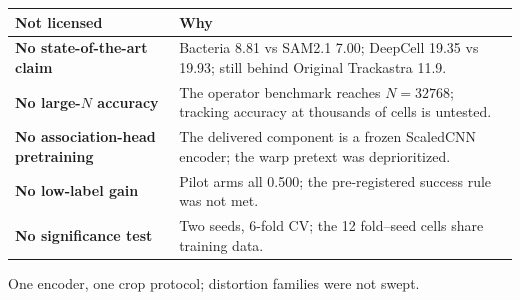 \begin{frame}
  \centering
  \scriptsize
  \renewcommand{\arraystretch}{1.25}
  \setlength{\tabcolsep}{1.8mm}
  \begin{tabular}{@{}p{42mm}>{\raggedright\arraybackslash}p{94mm}@{}}
    \toprule
    \textbf{Not licensed} & \textbf{Why}\\
    \midrule
    \textbf{No state-of-the-art claim} &
    Bacteria 8.81 vs SAM2.1 7.00; DeepCell 19.35 vs 19.93; still behind Original Trackastra 11.9.\\
    \textbf{No large-$N$ accuracy} &
    The operator benchmark reaches $N{=}32768$; tracking accuracy at thousands of cells is untested.\\
    \textbf{No association-head pretraining} &
    The delivered component is a frozen ScaledCNN encoder; the warp pretext was deprioritized.\\
    \textbf{No low-label gain} &
    Pilot arms all 0.500; the pre-registered success rule was not met.\\
    \textbf{No significance test} &
    Two seeds, 6-fold CV; the 12 fold--seed cells share training data.\\
    \bottomrule
  \end{tabular}
  \vspace{3mm}

  {\footnotesize One encoder, one crop protocol; distortion families were not swept.}
\end{frame}
